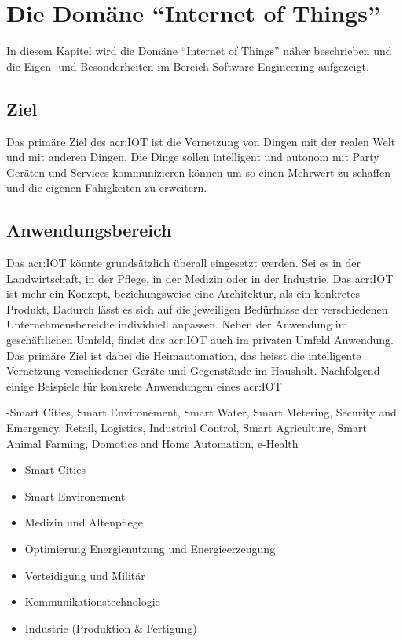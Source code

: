 \chapter{Die Domäne "`Internet of Things"'}
In diesem Kapitel wird die Domäne "`Internet of Things"' näher beschrieben und die Eigen- und Besonderheiten im Bereich Software Engineering aufgezeigt.

\section{Ziel}
Das primäre Ziel des \gls{acr:IOT} ist die Vernetzung von Dingen mit der realen Welt und mit anderen Dingen. Die Dinge sollen intelligent und autonom mit Party Geräten und Services kommunizieren können um so einen Mehrwert zu schaffen und die eigenen Fähigkeiten zu erweitern. 

\section{Anwendungsbereich}
Das \gls{acr:IOT} könnte grundsätzlich überall eingesetzt werden. Sei es in der Landwirtschaft, in der Pflege, in der Medizin oder in der Industrie. Das \gls{acr:IOT} ist mehr ein Konzept, beziehungsweise eine Architektur, als ein konkretes Produkt, Dadurch lässt es sich auf die jeweiligen Bedürfnisse der verschiedenen Unternehmensbereiche individuell anpassen. Neben der Anwendung im geschäftlichen Umfeld, findet das \gls{acr:IOT} auch im privaten Umfeld Anwendung. Das primäre Ziel ist dabei die Heimautomation, das heisst die intelligente Vernetzung verschiedener Geräte und Gegenstände im Haushalt. Nachfolgend einige Beispiele für konkrete Anwendungen eines \gls{acr:IOT}

-Smart Cities, Smart Environement, Smart Water, Smart Metering, Security and Emergency, Retail, Logistics, Industrial Control, Smart Agriculture, Smart Animal Farming, Domotics and Home Automation, e-Health
\begin{itemize}
\item Smart Cities
\item Smart Environement
\item Medizin und Altenpflege
\item Optimierung Energienutzung und Energieerzeugung
\item Verteidigung und Militär
\item Kommunikationstechnologie
\item Industrie (Produktion \& Fertigung)
\end{itemize}

